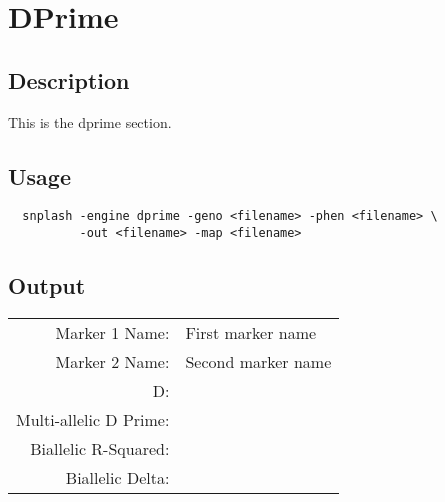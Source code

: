 \section{DPrime}
\label{sec:dprime}

\subsection{Description}
This is the dprime section.

\subsection{Usage}
\begin{verbatim}
  snplash -engine dprime -geno <filename> -phen <filename> \
          -out <filename> -map <filename>
\end{verbatim}

\subsection{Output}

\begin{supertabular}{r p{5in}}
  Marker 1 Name: & First marker name \\
  Marker 2 Name: & Second marker name \\
  D: & \\
  Multi-allelic D Prime: & \\
  Biallelic R-Squared: & \\
  Biallelic Delta: &  \\
\end{supertabular}